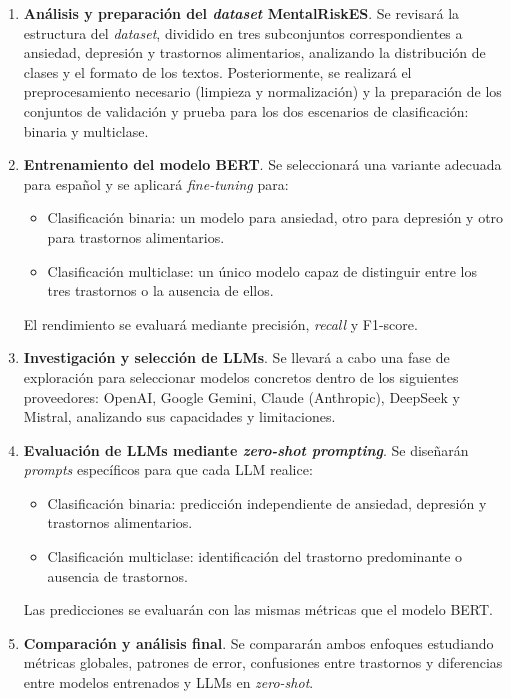\documentclass[11pt,a4paper,oneside]{article}
\begin{document}
\begin{enumerate}
	\item \textbf{Análisis y preparación del \textit{dataset} MentalRiskES}.  
	Se revisará la estructura del \textit{dataset}, dividido en tres subconjuntos correspondientes a ansiedad, depresión y trastornos alimentarios, analizando la distribución de clases y el formato de los textos. Posteriormente, se realizará el preprocesamiento necesario (limpieza y normalización) y la preparación de los conjuntos de validación y prueba para los dos escenarios de clasificación: binaria y multiclase.
	
	\item \textbf{Entrenamiento del modelo BERT}.  
	Se seleccionará una variante adecuada para español y se aplicará \textit{fine-tuning} para:
	\begin{itemize}
		\item Clasificación binaria: un modelo para ansiedad, otro para depresión y otro para trastornos alimentarios.
		\item Clasificación multiclase: un único modelo capaz de distinguir entre los tres trastornos o la ausencia de ellos.
	\end{itemize}
	El rendimiento se evaluará mediante precisión, \textit{recall} y F1-score.
	
	\item \textbf{Investigación y selección de LLMs}.  
	Se llevará a cabo una fase de exploración para seleccionar modelos concretos dentro de los siguientes proveedores: OpenAI, Google Gemini, Claude (Anthropic), DeepSeek y Mistral, analizando sus capacidades y limitaciones.
	
	\item \textbf{Evaluación de LLMs mediante \textit{zero-shot prompting}}.  
	Se diseñarán \textit{prompts} específicos para que cada LLM realice:
	\begin{itemize}
		\item Clasificación binaria: predicción independiente de ansiedad, depresión y trastornos alimentarios.
		\item Clasificación multiclase: identificación del trastorno predominante o ausencia de trastornos.
	\end{itemize}
	Las predicciones se evaluarán con las mismas métricas que el modelo BERT.
	
	\item \textbf{Comparación y análisis final}.  
	Se compararán ambos enfoques estudiando métricas globales, patrones de error, confusiones entre trastornos y diferencias entre modelos entrenados y LLMs en \textit{zero-shot}.
\end{enumerate}
\end{document}

